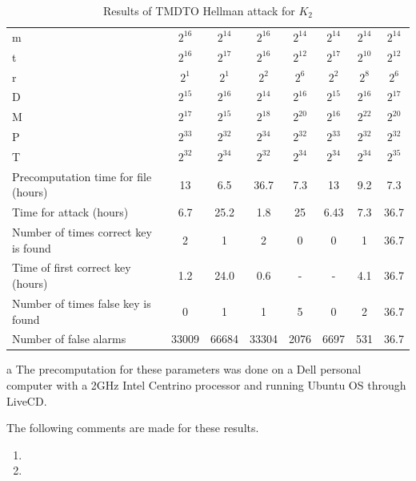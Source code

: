 \begin{table}[ht!]
\begin{center}
\caption{Results of TMDTO Hellman attack for $K_2$}
\smallskip
\smallskip
\begin{threeparttable}
\begin{tabular}{|p{3.5cm}||c|c|c|c|c|c|c|}
\hline
m																				&	$2^{16}$ 	&	$2^{14}$ 	&	$2^{16}$ 	&	$2^{14}$ &	$2^{14}$ 	&	$2^{14}$ 	&	$2^{14}$	\\ 
t	  																		&	$2^{16}$ 	&	$2^{17}$ 	&	$2^{16}$ 	&	$2^{12}$ &	$2^{17}$ 	&	$2^{10}$ 	&	$2^{12}$	\\ 
r	  																		&	$2^{1}$ 	&	$2^{1}$ 	&	$2^{2}$ 	&	$2^{6}$	 &	$2^{2}$ 	&	$2^{8}$ 	&	$2^{6}$		\\ 
D	  																		&	$2^{15}$ 	&	$2^{16}$ 	&	$2^{14}$ 	&	$2^{16}$ &	$2^{15}$ 	&	$2^{16}$ 	&	$2^{17}$	\\ \hline \hline
M																				&	$2^{17}$ 	&	$2^{15}$ 	&	$2^{18}$ 	&	$2^{20}$ &	$2^{16}$ 	&	$2^{22}$ 	&	$2^{20}$	\\ 
P	  																		&	$2^{33}$ 	&	$2^{32}$ 	&	$2^{34}$ 	&	$2^{32}$ &	$2^{33}$ 	&	$2^{32}$ 	&	$2^{32}$	\\ 
T	  																		&	$2^{32}$ 	&	$2^{34}$ 	&	$2^{32}$ 	&	$2^{34}$ &	$2^{34}$ 	&	$2^{34}$ 	&	$2^{35}$	\\ \hline \hline
Precomputation time for file (hours)		&	13 	 			&	6.5 			&	36.7 \tnote{a}	&	7.3&	13 	 			&	9.2 \tnote{a} &	7.3		\\ \hline
Time for attack	(hours)									&	6.7 			&	25.2			&	1.8			 	&	25	 		 &	6.43 			&	7.3 			&	36.7			\\ \hline
Number of times correct key is found 		&	2 				&	1					&	2 				&	0 			 &	0 	 			&	1   			&	36.7			\\ \hline
Time of first correct key (hours)				&	1.2 			&	24.0			&	0.6	 		 	&	-		 		 &	- 	 			&	4.1 			&	36.7			\\ \hline
Number of times false key is found			&	0 				&	1 				&	1					&	5				 &	0 	 			&	2 				&	36.7			\\ \hline
Number of false alarms									&	33009			&	66684			&	33304			&	2076		 &	6697 			&	531				&	36.7			\\ \hline
\end{tabular}
\smallskip
\begin{tablenotes}
	\item[a] The precomputation for these parameters was done on a Dell personal computer with a 2GHz Intel Centrino processor and running Ubuntu OS through LiveCD.
\end{tablenotes}
\end{threeparttable}
\end{center}
\label{tab:hellman-attack-results}
\end{table}

The following comments are made for these results.
\begin{enumerate}
\item 
\item 
\end{enumerate}